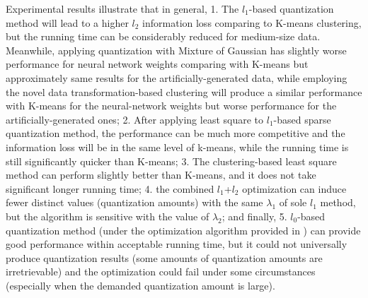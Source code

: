 \documentclass[preprint,10pt]{elsarticle}
\begin{document}
Experimental results illustrate that in general, 1. The $l_1$-based quantization method will lead to a higher $l_2$ information loss comparing to K-means clustering, but the running time can be considerably reduced for medium-size data. Meanwhile, applying quantization with Mixture of Gaussian has slightly worse performance for neural network weights comparing with K-means but approximately same results for the artificially-generated data, while employing the novel data transformation-based clustering will produce a similar performance with K-means for the neural-network weights but worse performance for the artificially-generated ones; 2. After applying least square to $l_1$-based sparse quantization method, the performance can be much more competitive and the information loss will be in the same level of k-means, while the running time is still significantly quicker than K-means; 3. The clustering-based least square method can perform slightly better than K-means, and it does not take significant longer running time; 4. the combined $l_1$+$l_2$ optimization can induce fewer distinct values (quantization amounts) with the same $\lambda_1$ of sole $l_1$ method, but the algorithm is sensitive with the value of $\lambda_2$; and finally, 5. $l_0$-based quantization method (under the optimization algorithm provided in \cite{l0Learn2018Hazimeh}) can provide good performance within acceptable running time, but it could not universally produce quantization results (some amounts of quantization amounts are irretrievable) and the optimization could fail under some circumstances (especially when the demanded quantization amount is large).
\end{document}
